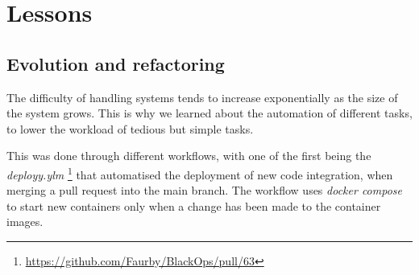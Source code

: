 \section{Lessons}
\label{sec:mpt}






\subsection{Evolution and refactoring}
The difficulty of handling systems tends to increase exponentially as the size of the system grows. This is why we learned about the automation of different tasks, to lower the workload of tedious but simple tasks. 

This was done through different workflows, with one of the first being the \textit{deployy.ylm} \footnote{\url{https://github.com/Faurby/BlackOps/pull/63}} that automatised the deployment of new code integration, when merging a pull request into the main branch. The workflow uses \textit{docker compose} to start new containers only when a change has been made to the container images.





